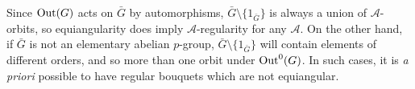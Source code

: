 \documentclass[12pt]{article}
\newcommand{\cA}{\ensuremath{\mathcal{A}}}
\newcommand{\cY}{\ensuremath{\mathcal{Y}}}
\newcommand{\fa}{\ensuremath{\mathfrak{a}}}
\newcommand{\fo}{\ensuremath{\mathfrak{o}}}
\newcommand{\Out}{{\rm Out}}
\newcommand{\barG}{\ensuremath{\bar{G}}}
\begin{document}
Since $\Out(G)$ acts on $\bar{G}$ by automorphisms, $\bar{G}\setminus\{1_{\bar{G}}\}$ is always a union of $\cA$-orbits, so equiangularity does imply $\cA$-regularity for any $\cA$. On the other hand, if $\bar{G}$
is not an elementary abelian $p$-group, $\bar{G}\setminus\{1_{\bar{G}}\}$ will contain elements of different orders, and so more than one orbit under $\Out^0(G)$. In such cases, it is \textit{a priori} possible to have regular bouquets which are not equiangular. 
\end{document}
